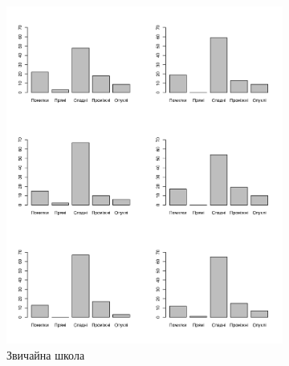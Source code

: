 
\begin{figure}[h]
  \centering
  \begin{subfigure}[b]{0.45\textwidth}
    \includegraphics[width=\textwidth]{images/poisson_types}
    \caption{Звичайна школа}
    \label{fig:tapping:poisson:types}
  \end{subfigure}
  \begin{subfigure}[b]{0.45\textwidth}

\end{subfigure}
\end{figure}
